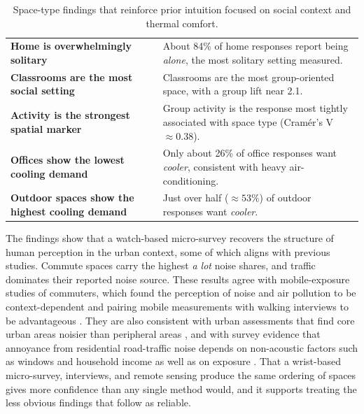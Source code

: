 \documentclass[]{interact}
\begin{document}
\begin{table}[htbp]
\centering
\caption{Space-type findings that reinforce prior intuition focused on social context and thermal comfort.}
\label{tab:insights-social-thermal}
\footnotesize
\renewcommand{\arraystretch}{1.3}
\begin{tabularx}{\textwidth}{@{}>{\raggedright\arraybackslash\bfseries}p{} >{\raggedright\arraybackslash}X@{}}
\midrule
Home is overwhelmingly solitary & About 84\% of home responses report being \emph{alone}, the most solitary setting measured. \\
Classrooms are the most social setting & Classrooms are the most group-oriented space, with a group lift near 2.1. \\
Activity is the strongest spatial marker & Group activity is the response most tightly associated with space type (Cram\'er's V $\approx 0.38$). \\
Offices show the lowest cooling demand & Only about 26\% of office responses want \emph{cooler}, consistent with heavy air-conditioning. \\
Outdoor spaces show the highest cooling demand & Just over half ($\approx 53\%$) of outdoor responses want \emph{cooler}. \\
\bottomrule
\end{tabularx}
\end{table}

The findings show that a watch-based micro-survey recovers the structure of human perception in the urban context, some of which aligns with previous studies.
Commute spaces carry the highest \emph{a lot} noise shares, and traffic dominates their reported noise source.
These results agree with mobile-exposure studies of commuters, which found the perception of noise and air pollution to be context-dependent and pairing mobile measurements with walking interviews to be advantageous \citep{Marquart2022-rt}.
They are also consistent with urban assessments that find core urban areas noisier than peripheral areas \citep{Kumar2013-if}, and with survey evidence that annoyance from residential road-traffic noise depends on non-acoustic factors such as windows and household income as well as on exposure \citep{Preisendorfer2022-qh}.
That a wrist-based micro-survey, interviews, and remote sensing produce the same ordering of spaces gives more confidence than any single method would, and it supports treating the less obvious findings that follow as reliable.
\end{document}
